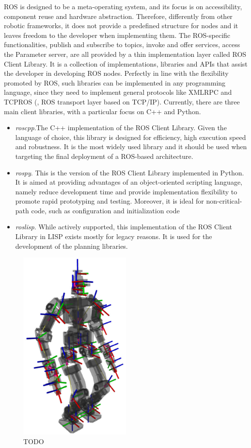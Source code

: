 ROS is designed to be a meta-operating system, and its focus is on accessibility, component reuse and hardware abstraction. Therefore, differently from other robotic frameworks, it does not provide a predefined structure for nodes and it leaves freedom to the developer when implementing them. The ROS-specific functionalities, publish and subscribe to topics, invoke and offer services, access the Parameter server, are all provided by a thin implementation layer called ROS Client Library. It is a collection of implementations, libraries and APIs that assist the developer in developing ROS nodes. Perfectly in line with the flexibility promoted by ROS, such libraries can be implemented in any programming language, since they need to implement general protocols like XMLRPC and TCPROS (\ie, ROS transport layer based on TCP/IP). Currently, there are three main client libraries, with a particular focus on C++ and Python.
\begin{itemize}
\item \textit{roscpp}.The C++ implementation of the ROS Client Library. Given the language of choice, this library is designed for efficiency, high execution speed and robustness. It is the most widely used library and it should be used when targeting the final deployment of a ROS-based architecture. 
\item \textit{rospy}. This is the version of the ROS Client Library implemented in Python. It is aimed at providing advantages of an object-oriented scripting language, namely reduce development time and provide implementation flexibility to promote rapid prototyping and testing. Moreover, it is  ideal for non-critical-path code, such as configuration and initialization code
\item \textit{roslisp}. While actively supported, this implementation of the ROS Client Library in LISP exists mostly for legacy reasons. It is used for the development of the planning libraries. 
\end{itemize}

\begin{figure}[t]
    \centering
    \includegraphics[width=0.5\textwidth]{gfx/ros/tf_frames}
    \caption{TODO}\label{fig:ros-tf}
\end{figure}

